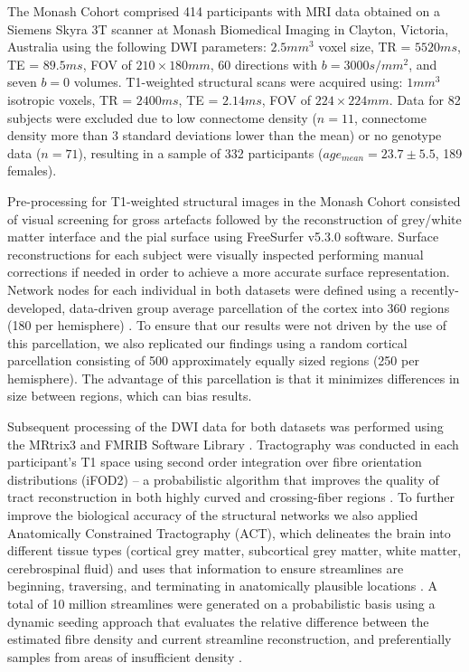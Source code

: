 The Monash Cohort comprised 414 participants with MRI data obtained on a Siemens Skyra 3T scanner at Monash Biomedical Imaging in Clayton, Victoria, Australia using the following DWI parameters: $2.5 mm^{3}$ voxel size, TR = $5520 ms$, TE = $89.5 ms$, FOV of $210 \times 180 mm$, 60 directions with $b = 3000 s/mm^{2}$, and seven $b = 0$ volumes. T1-weighted structural scans were acquired using: $1 mm^{3}$ isotropic voxels, TR = $2400 ms$, TE = $2.14 ms$, FOV of $224 \times 224 mm$. Data for 82 subjects were excluded due to low connectome density ($n = 11$, connectome density more than 3 standard deviations lower than the mean) or no genotype data ($n = 71$), resulting in a sample of 332 participants ($age_{mean} = 23.7 \pm 5.5$, 189 females).

Pre-processing for T1-weighted structural images in the Monash Cohort consisted of visual screening for gross artefacts followed by the reconstruction of grey/white matter interface and the pial surface using FreeSurfer v5.3.0 software. Surface reconstructions for each subject were visually inspected performing manual corrections if needed in order to achieve a more accurate surface representation. Network nodes for each individual in both datasets were defined using a recently-developed, data-driven group average parcellation of the cortex into 360 regions (180 per hemisphere) \citep{Glasser2016}. To ensure that our results were not driven by the use of this parcellation, we also replicated our findings using a random cortical parcellation consisting of 500 approximately equally sized regions (250 per hemisphere). The advantage of this parcellation is that it minimizes differences in size between regions, which can bias results.

Subsequent processing of the DWI data for both datasets was performed using the MRtrix3 \citep{Tournier2012} and FMRIB Software Library \citep{Jenkinson2012}. Tractography was conducted in each participant's T1 space using second order integration over fibre orientation distributions (iFOD2) – a probabilistic algorithm that improves the quality of tract reconstruction in both highly curved and crossing-fiber regions \citep{Tournier2010}. To further improve the biological accuracy of the structural networks we also applied Anatomically Constrained Tractography (ACT), which delineates the brain into different tissue types (cortical grey matter, subcortical grey matter, white matter, cerebrospinal fluid) and uses that information to ensure streamlines are beginning, traversing, and terminating in anatomically plausible locations \citep{Smith2012}. A total of 10 million streamlines were generated on a probabilistic basis using a dynamic seeding approach that evaluates the relative difference between the estimated fibre density and current streamline reconstruction, and preferentially samples from areas of insufficient density \citep{Smith2015a}.

